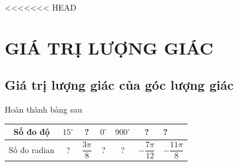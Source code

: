 <<<<<<< HEAD
\setcounter{section}{0}
\section{GIÁ TRỊ LƯỢNG GIÁC}
\subsection{Giá trị lượng giác của góc lượng giác}
\begin{bt}%
	Hoàn thành bảng sau
	\begin{center}
	\renewcommand{\arraystretch}{2}
	\begin{tabular}{|c|c|c|c|c|c|l|}
	\hline
	Số đo độ     & $15^\circ$ & ? & $0^\circ$ & $900^\circ$ & ? & ?  \\ \hline
	Số đo radian & ?  & $\dfrac{3\pi}{8}$ & ? & ?   & $-\dfrac{7\pi}{12}$ & $-\dfrac{11\pi}{8}$ \\ \hline
	\end{tabular}
	\end{center}
\end{bt}

